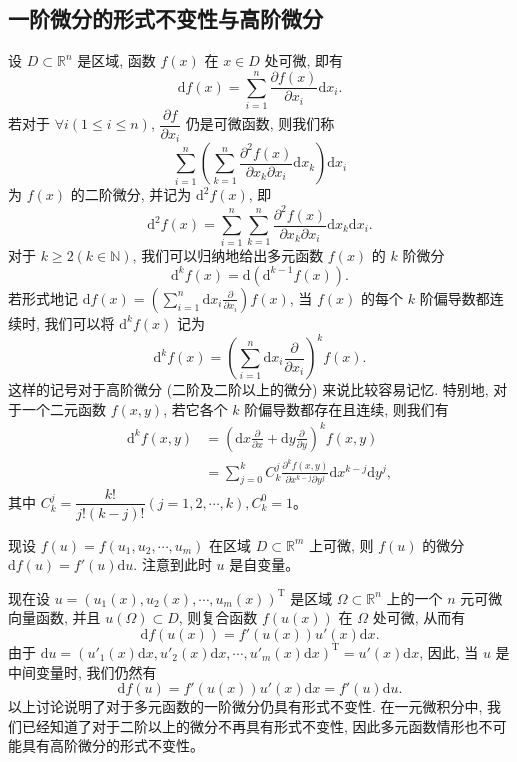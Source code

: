 \documentclass[12pt,fontset=fandol]{ctexart}
\begin{document}
\subsection{一阶微分的形式不变性与高阶微分}

设 $D\subset\mathbb R^n$ 是区域, 函数 $f(x)$ 在 $x\in D$ 处可微, 即有
\[
  \mathrm df(x)=\sum_{i=1}^n\frac{\partial f(x)}{\partial x_i}\mathrm dx_i.
\]
若对于 $\forall i(1\leqslant i\leqslant n)$, $\dfrac{\partial f}{\partial x_i}$ 仍是可微函数, 则我们称
\[
  \sum_{i=1}^n\left(\sum_{k=1}^n
  \frac{\partial^2 f(x)}{\partial x_k\partial x_i}\mathrm dx_k\right)\mathrm dx_i
\]
为 $f(x)$ 的二阶微分, 并记为 $\mathrm d^2f(x)$, 即
\[
  \mathrm d^2f(x)=\sum_{i=1}^n\sum_{k=1}^n
  \frac{\partial^2 f(x)}{\partial x_k\partial x_i}\mathrm dx_k\mathrm dx_i.
\]
对于 $k\geqslant2(k\in\mathbb N)$, 我们可以归纳地给出多元函数 $f(x)$ 的 $k$ 阶微分
\[
  \mathrm d^kf(x)=\mathrm d(\mathrm d^{k-1}f(x)).
\]
若形式地记 $\mathrm df(x)=\left(\sum_{i=1}^n\mathrm dx_i\frac{\partial}{\partial x_i}\right)f(x)$, 当 $f(x)$ 的每个 $k$ 阶偏导数都连续时, 我们可以将 $\mathrm d^kf(x)$ 记为
\[
  \mathrm d^kf(x)=\left(\sum_{i=1}^n\mathrm dx_i\frac{\partial}{\partial x_i}\right)^kf(x).
\]
这样的记号对于高阶微分 (二阶及二阶以上的微分) 来说比较容易记忆. 特别地, 对于一个二元函数 $f(x,y)$, 若它各个 $k$ 阶偏导数都存在且连续, 则我们有
\[
\begin{aligned}
  \mathrm d^kf(x,y)
  &=\left(\mathrm dx\frac{\partial}{\partial x}
  +\mathrm dy\frac{\partial}{\partial y}\right)^kf(x,y)\\
  &=\sum_{j=0}^k C_k^j
  \frac{\partial^k f(x,y)}{\partial x^{k-j}\partial y^j}
  \mathrm dx^{k-j}\mathrm dy^j,
\end{aligned}
\]
其中 $C_k^j=\dfrac{k!}{j!(k-j)!}(j=1,2,\cdots,k),C_k^0=1$。

现设 $f(u)=f(u_1,u_2,\cdots,u_m)$ 在区域 $D\subset\mathbb R^m$ 上可微, 则 $f(u)$ 的微分 $\mathrm df(u)=f'(u)\mathrm du$. 注意到此时 $u$ 是自变量。

现在设 $u=(u_1(x),u_2(x),\cdots,u_m(x))^\mathrm T$ 是区域 $\Omega\subset\mathbb R^n$ 上的一个 $n$ 元可微向量函数, 并且 $u(\Omega)\subset D$, 则复合函数 $f(u(x))$ 在 $\Omega$ 处可微, 从而有
\[
  \mathrm df(u(x))=f'(u(x))u'(x)\mathrm dx.
\]
由于 $\mathrm du=(u'_1(x)\mathrm dx,u'_2(x)\mathrm dx,\cdots,u'_m(x)\mathrm dx)^\mathrm T=u'(x)\mathrm dx$, 因此, 当 $u$ 是中间变量时, 我们仍然有
\[
  \mathrm df(u)=f'(u(x))u'(x)\mathrm dx=f'(u)\mathrm du.
\]
以上讨论说明了对于多元函数的一阶微分仍具有形式不变性. 在一元微积分中, 我们已经知道了对于二阶以上的微分不再具有形式不变性, 因此多元函数情形也不可能具有高阶微分的形式不变性。
\end{document}
